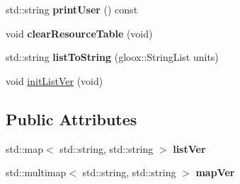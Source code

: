 \begin{DoxyCompactItemize}
\item 
\hypertarget{classDatabase_a5d733ffa13f136481e3dbdabc9b9ce99}{
std::string {\bfseries printUser} () const }
\label{classDatabase_a5d733ffa13f136481e3dbdabc9b9ce99}

\item 
\hypertarget{classDatabase_a84791e2489f1aace2bfba61e6e5fdd77}{
void {\bfseries clearResourceTable} (void)}
\label{classDatabase_a84791e2489f1aace2bfba61e6e5fdd77}

\item 
\hypertarget{classDatabase_af8cc000733b73f596f49a0c4a65637ff}{
std::string {\bfseries listToString} (gloox::StringList units)}
\label{classDatabase_af8cc000733b73f596f49a0c4a65637ff}

\item 
void \hyperlink{classDatabase_a94ac4a7584707bfd40643e437e7471a8}{initListVer} (void)
\end{DoxyCompactItemize}
\subsection*{Public Attributes}
\begin{DoxyCompactItemize}
\item 
\hypertarget{classDatabase_a15b316cae6fa42bd196fe02604d6885f}{
std::map$<$ std::string, std::string $>$ {\bfseries listVer}}
\label{classDatabase_a15b316cae6fa42bd196fe02604d6885f}

\item 
\hypertarget{classDatabase_a5d3b8a26bb76c91209970d278cb0faec}{
std::multimap$<$ std::string, std::string $>$ {\bfseries mapVer}}
\label{classDatabase_a5d3b8a26bb76c91209970d278cb0faec}

\end{DoxyCompactItemize}
